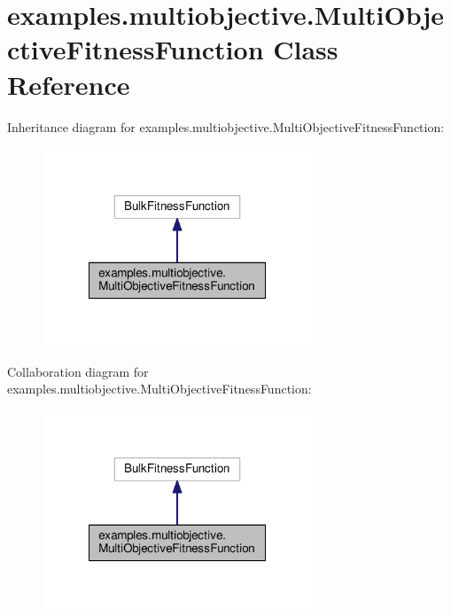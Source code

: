 \hypertarget{classexamples_1_1multiobjective_1_1_multi_objective_fitness_function}{\section{examples.\-multiobjective.\-Multi\-Objective\-Fitness\-Function Class Reference}
\label{classexamples_1_1multiobjective_1_1_multi_objective_fitness_function}
}


Inheritance diagram for examples.\-multiobjective.\-Multi\-Objective\-Fitness\-Function\-:
\nopagebreak
\begin{figure}[H]
\begin{center}
\leavevmode
\includegraphics[width=228pt]{classexamples_1_1multiobjective_1_1_multi_objective_fitness_function__inherit__graph}
\end{center}
\end{figure}


Collaboration diagram for examples.\-multiobjective.\-Multi\-Objective\-Fitness\-Function\-:
\nopagebreak
\begin{figure}[H]
\begin{center}
\leavevmode
\includegraphics[width=228pt]{classexamples_1_1multiobjective_1_1_multi_objective_fitness_function__coll__graph}
\end{center}
\end{figure}
